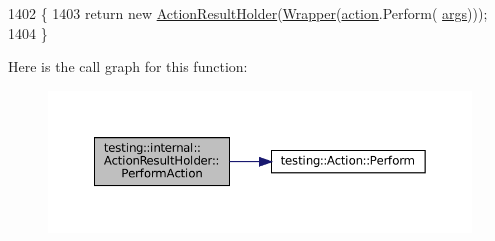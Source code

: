 \begin{DoxyCode}
1402                                                                \{
1403     \textcolor{keywordflow}{return} \textcolor{keyword}{new} \hyperlink{classtesting_1_1internal_1_1ActionResultHolder_abd600b0ffabe799853682d791cb24c77}{ActionResultHolder}(\hyperlink{classtesting_1_1internal_1_1ActionResultHolder_aa483b488570efd86657857501dce2b1d}{Wrapper}(\hyperlink{namespaceupload_a675d13c979f1c720866d22ed1736f580}{action}.Perform(
      \hyperlink{namespacegenerate__debs_a75f9143e38df82d83b2e8a6f99cae02c}{args})));
1404   \}
\end{DoxyCode}
Here is the call graph for this function\+:
\nopagebreak
\begin{figure}[H]
\begin{center}
\leavevmode
\includegraphics[width=350pt]{classtesting_1_1internal_1_1ActionResultHolder_a9e10aff754b5caf69b14964f3c9c79ec_cgraph}
\end{center}
\end{figure}
\mbox{\label{classtesting_1_1internal_1_1ActionResultHolder_a9609dcb5fb16271f83d777b087075272}} 
